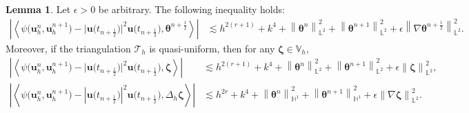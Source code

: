 \documentclass[11pt, reqno]{amsart}
\theoremstyle{definition}
\newtheorem{lemma}[theorem]{Lemma}
\theoremstyle{remark}
\numberwithin{equation}{section}
\newcommand{\bff}{\boldsymbol}
\newcommand{\bb}{\mathbb}
\newcommand{\norm}[2]{\left\|{#1}\right\|_{#2}}
\newcommand{\inpro}[2]{\left\langle#1,#2\right\rangle}
\newcommand{\abs}[1]{\left|{#1}\right|}
\begin{document}
\begin{lemma}\label{lem:cub disc}
Let $\epsilon>0$ be arbitrary. The following inequality holds:
\begin{align}\label{equ:psi theta disc}
	\left| \inpro{\psi\big(\bff{u}_h^n, \bff{u}_h^{n+1}\big) - \big|\bff{u}\big(t_{n+\frac{1}{2}}\big)\big|^2 \bff{u}\big(t_{n+\frac{1}{2}}\big)}{\bff{\theta}^{n+\frac{1}{2}}} \right| 
	&\lesssim
	h^{2(r+1)} + k^4 + \norm{\bff{\theta}^n}{\bb{L}^2}^2 + \norm{\bff{\theta}^{n+1}}{\bb{L}^2}^2 
	+ \epsilon \norm{\nabla \bff{\theta}^{n+\frac{1}{2}}}{\bb{L}^2}^2.
\end{align}
Moreover, if the triangulation $\mathcal{T}_h$ is quasi-uniform, then for any $\bff{\zeta}\in \bb{V}_h$,
\begin{align}\label{equ:psi xi disc}
	\left| \inpro{\psi\big(\bff{u}_h^n, \bff{u}_h^{n+1}\big) - \big|\bff{u}\big(t_{n+\frac{1}{2}}\big)\big|^2 \bff{u}\big(t_{n+\frac{1}{2}}\big)}{\bff{\zeta}} \right| 
	&\lesssim
	h^{2(r+1)} + k^4 + \norm{\bff{\theta}^n}{\bb{L}^2}^2 + \norm{\bff{\theta}^{n+1}}{\bb{L}^2}^2 
	+ \epsilon \norm{\bff{\zeta}}{\bb{L}^2}^2,
	\\
	\label{equ:psi xi Delta}
	\left| \inpro{\psi\big(\bff{u}_h^n,\bff{u}_h^{n+1}\big) - \abs{\bff{u}\big(t_{n+\frac{1}{2}}\big)}^2 \bff{u}\big(t_{n+\frac{1}{2}}\big)}{\Delta_h \bff{\zeta}} \right|
	&\lesssim
	h^{2r}+k^4+\norm{\bff{\theta}^n}{\bb{H}^1}^2 + \norm{\bff{\theta}^{n+1}}{\bb{H}^1}^2
	+
	\epsilon \norm{\nabla \bff{\zeta}}{\bb{L}^2}^2.
\end{align}
\end{lemma}
\end{document}
